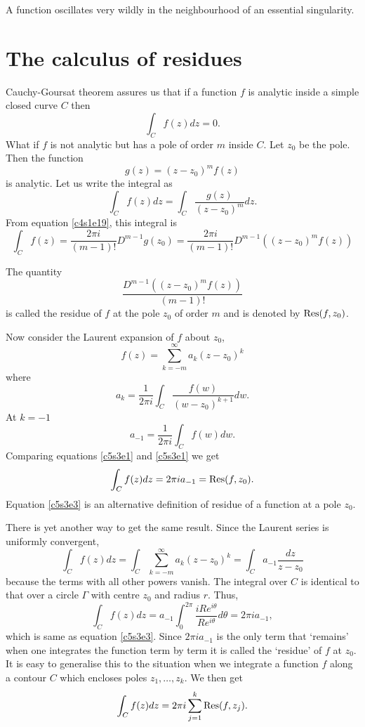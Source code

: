 \begin{rem}
A function oscillates very wildly in the neighbourhood of an essential singularity.
\end{rem}

\section{The calculus of residues}\label{c5s3}
Cauchy-Goursat theorem assures us that if a function $f$ is analytic inside a simple
closed curve $C$ then
\[
\int_C f(z)dz = 0.
\]
What if $f$ is not analytic but has a pole of order $m$ inside $C$. Let $z_0$
be the pole. Then the function
\[
g(z) = (z - z_0)^mf(z)
\]
is analytic. Let us write the integral as
\[
\int_C f(z)dz = \int_C \frac{g(z)}{(z - z_0)^m}dz.
\]
From equation \eqref{c4s1e19}, this integral is
\begin{equation}\label{c5s3e1}
\int_C f(z) = \frac{2\pi i}{(m-1)!}D^{m-1}g(z_0) = 
\frac{2\pi i}{(m-1)!}D^{m-1}((z - z_0)^mf(z))
\end{equation}

\begin{defn}\label{c5s3d1}
The quantity
\[
\frac{D^{m-1}((z - z_0)^mf(z))}{(m-1)!}
\]
is called the residue of $f$ at the pole $z_0$ of order $m$ and is denoted by 
$\operatorname{Res}(f,z_0)$.
\end{defn}

Now consider the Laurent expansion of $f$ about $z_0$,
\[
f(z) = \sum_{k=-m}^\infty a_k(z - z_0)^k
\]
where
\[
a_k = \frac{1}{2\pi i}\int_C \frac{f(w)}{(w - z_0)^{k+1}}dw.
\]
At $k = -1$
\begin{equation}\label{c5s3e2}
a_{-1} = \frac{1}{2\pi i}\int_C f(w)dw.
\end{equation}
Comparing equations \eqref{c5s3e1} and \eqref{c5s3e1} we get
\begin{equation}\label{c5s3e3}
\int_C f(z)dz = 2\pi i a_{-1} = \operatorname{Res}(f, z_0).
\end{equation}
Equation \eqref{c5s3e3} is an alternative definition of residue of a 
function at a pole $z_0$.

There is yet another way to get the same result. Since the Laurent series
is uniformly convergent,
\[
\int_C f(z)dz = \int_C \sum_{k=-m}^\infty a_k(z - z_0)^k = 
\int_C a_{-1}\frac{dz}{z - z_0}
\]
because the terms with all other powers vanish. The integral over $C$ is identical 
to that over a circle $\Gamma$ with centre $z_0$ and radius $r$. Thus,
\[
\int_C f(z)dz = a_{-1}\int_0^{2\pi}\frac{iRe^{i\theta}}{Re^{i\theta}}d\theta 
= 2\pi ia_{-1},
\]
which is same as equation \eqref{c5s3e3}. Since $2\pi ia_{-1}$ is the only
term that `remains' when one integrates the function term by term it is called
the `residue' of $f$ at $z_0$. It is easy to generalise this to the situation
when we integrate a function $f$ along a contour $C$ which encloses poles
$z_1, \ldots, z_k$. We then get
\begin{equation}\label{c5s3e4}
\int_C f(z)dz = 2\pi i \sum_{j=1}^k \operatorname{Res}(f, z_j).
\end{equation}

